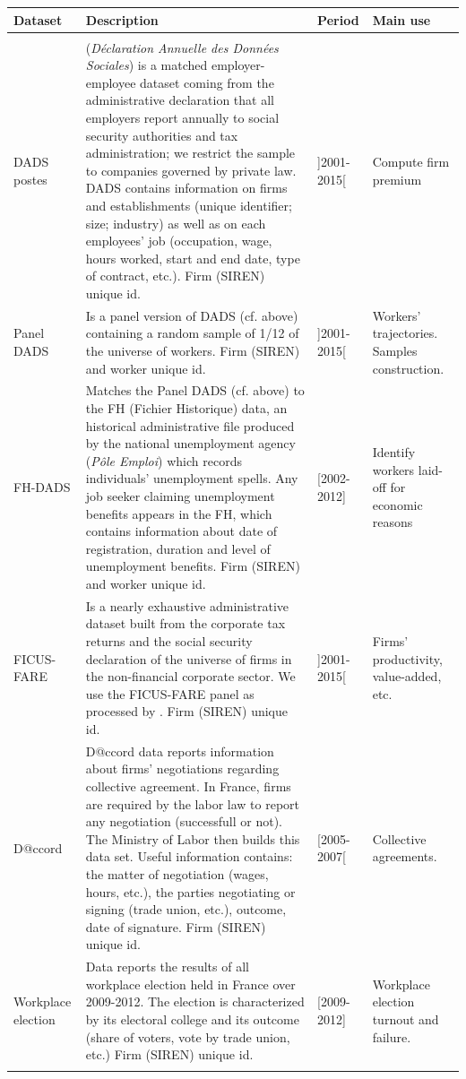{
\begin{tabularx}{\textwidth}{ZXlZ}
\hline
Dataset & Description & Period & Main use \\
\hline
&&&\\
DADS postes & (\textit{Déclaration Annuelle des Données Sociales}) is a matched employer-employee dataset coming from the administrative declaration that all employers report annually to social security authorities and tax administration; we restrict the sample to companies governed by private law. DADS contains information on firms and establishments (unique identifier; size; industry) as well as on each employees’ job (occupation, wage, hours worked, start and end date, type of contract, etc.). Firm (SIREN) unique id. & ]2001-2015[ & Compute firm premium \\
 Panel DADS & Is a panel version of DADS (cf. above) containing a random sample of 1/12 of the universe of workers. Firm (SIREN) and worker unique id. & ]2001-2015[ & Workers' trajectories. Samples construction. \\
FH-DADS  & Matches the Panel DADS (cf. above) to the FH (Fichier Historique) data, an historical administrative file produced by the national unemployment agency (\textit{Pôle Emploi}) which records individuals’ unemployment spells. Any job seeker claiming unemployment benefits appears in the FH, which contains information about date of registration, duration and level of unemployment benefits. Firm (SIREN) and worker unique id. & [2002-2012] & Identify workers laid-off for economic reasons \\
 FICUS-FARE  & Is a nearly exhaustive administrative dataset built from the corporate tax returns and the social security declaration of the universe of firms in the non-financial corporate sector. We use the FICUS-FARE panel as processed by \citet{burstein_etal_2025}. Firm (SIREN) unique id. & ]2001-2015[ & Firms' productivity, value-added, etc. \\
D@ccord  & D@ccord data reports information about firms' negotiations regarding collective agreement. In France, firms are required by the labor law to report any negotiation (successfull or not). The Ministry of Labor then builds this data set. Useful information contains: the matter of negotiation (wages, hours, etc.), the parties negotiating or signing (trade union, etc.), outcome, date of signature. Firm (SIREN) unique id. & [2005-2007[ & Collective agreements. \\
 Workplace election  & Data reports the results of all workplace election held in France over 2009-2012. The election is characterized by its electoral college and its outcome (share of voters, vote by trade union, etc.) Firm (SIREN) unique id. & [2009-2012] & Workplace election turnout and failure. \\
&&&\\ \hline
\end{tabularx}
}







